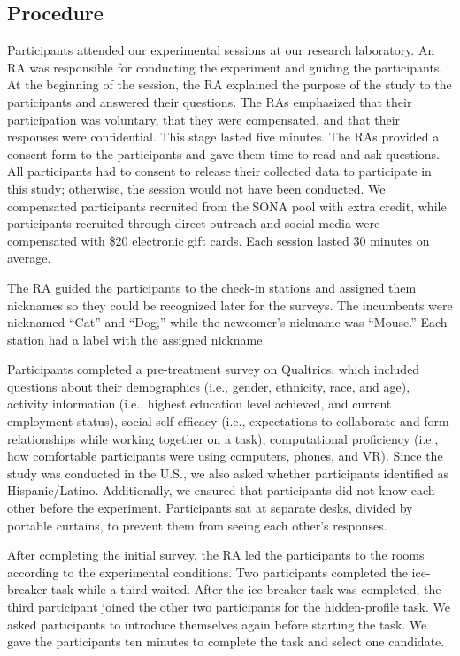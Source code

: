 \subsection{Procedure}
Participants attended our experimental sessions at our research laboratory. An RA was responsible for conducting the experiment and guiding the participants. At the beginning of the session, the RA explained the purpose of the study to the participants and answered their questions. The RAs emphasized that their participation was voluntary, that they were compensated, and that their responses were confidential. This stage lasted five minutes. The RAs provided a consent form to the participants and gave them time to read and ask questions. All participants had to consent to release their collected data to participate in this study; otherwise, the session would not have been conducted. We compensated participants recruited from the SONA pool with extra credit, while participants recruited through direct outreach and social media were compensated with \$20 electronic gift cards. Each session lasted 30 minutes on average.

The RA guided the participants to the check-in stations and assigned them nicknames so they could be recognized later for the surveys. The incumbents were nicknamed ``Cat'' and ``Dog,'' while the newcomer's nickname was ``Mouse.'' Each station had a label with the assigned nickname.

Participants completed a pre-treatment survey on Qualtrics, which included questions about their demographics (i.e., gender, ethnicity, race, and age), activity information (i.e., highest education level achieved, and current employment status), social self-efficacy (i.e., expectations to collaborate and form relationships while working together on a task), computational proficiency (i.e., how comfortable participants were using computers, phones, and VR). Since the study was conducted in the U.S., we also asked whether participants identified as Hispanic/Latino. Additionally, we ensured that participants did not know each other before the experiment. Participants sat at separate desks, divided by portable curtains, to prevent them from seeing each other's responses.

After completing the initial survey, the RA led the participants to the rooms according to the experimental conditions. Two participants completed the ice-breaker task while a third waited. After the ice-breaker task was completed, the third participant joined the other two participants for the hidden-profile task. We asked participants to introduce themselves again before starting the task. We gave the participants ten minutes to complete the task and select one candidate. 

